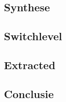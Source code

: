 \documentclass{scrartcl} %
\begin{document}
\subsection{Synthese}


\subsection{Switchlevel}


\subsection{Extracted}

\subsection{Conclusie}
\end{document}

